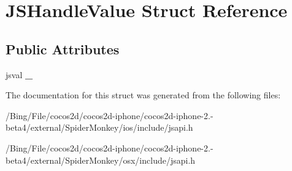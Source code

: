 \hypertarget{struct_j_s_handle_value}{\section{J\-S\-Handle\-Value Struct Reference}
\label{struct_j_s_handle_value}
}
\subsection*{Public Attributes}
\begin{DoxyCompactItemize}
\item 
\hypertarget{struct_j_s_handle_value_a22fcdf24a1032a36216d28f09ea2a482}{jsval {\bfseries \-\_\-}}\label{struct_j_s_handle_value_a22fcdf24a1032a36216d28f09ea2a482}

\end{DoxyCompactItemize}


The documentation for this struct was generated from the following files\-:\begin{DoxyCompactItemize}
\item 
/\-Bing/\-File/cocos2d/cocos2d-\/iphone/cocos2d-\/iphone-\/2.-\/beta4/external/\-Spider\-Monkey/ios/include/jsapi.\-h\item 
/\-Bing/\-File/cocos2d/cocos2d-\/iphone/cocos2d-\/iphone-\/2.-\/beta4/external/\-Spider\-Monkey/osx/include/jsapi.\-h\end{DoxyCompactItemize}
